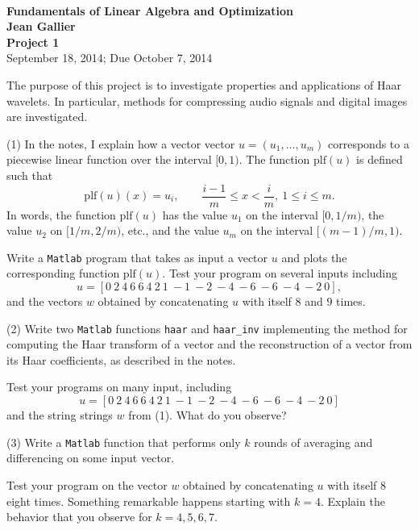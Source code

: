 \documentclass[12pt]{article}
\begin{document}
\begin{center}
\\
\vspace{1cm}
{\Large\bf Fundamentals of Linear Algebra and Optimization\\
Jean Gallier \\
\vspace{0.5cm}
Project 1}\\[10pt]
September 18,  2014; Due October 7, 2014\\
\end{center}

\vspace{0.5cm}
The purpose of this project is to investigate properties and
applications of Haar wavelets. In particular, methods for compressing 
audio signals and digital images are investigated.

\medskip
(1)
In  the notes, I explain how a vector
vector $u = (u_1, \ldots, u_m)$  corresponds to  a piecewise
linear function over the interval $[0, 1)$. The function
$\mathrm{plf}(u)$ is defined such that
\[
\mathrm{plf}(u)(x) = u_i, \quad\quad \frac{i -1}{m} \leq x < \frac{i}{m},
\> 1 \leq i \leq m. 
\]
In words, the function $\mathrm{plf}(u)$ has the  value
$u_1$ on the interval $[0, 1/m)$, the value $u_2$ on $[1/m, 2/m)$,
etc., and the value $u_m$ on the interval $[(m - 1)/m, 1)$.

\medskip
Write a {\tt Matlab} program that takes as input a vector $u$
and plots the corresponding function $\mathrm{plf}(u)$.
Test your program on several inputs including 
\[
u = [0\> 2\> 4\> 6\> 6\> 4\> 2\> 1\> -1\> -2\> -4\> -6\> -6\> -4\> -2\> 0],
\]
and the vectors $w$ obtained by concatenating $u$ with itself $8$ and
$9$ times.


\medskip
(2)
Write two {\tt Matlab} functions {\tt haar} and {\tt haar\_inv}
implementing the method for computing the Haar transform
of a vector and the reconstruction of a vector from its Haar
coefficients, as described in the notes.

\medskip
Test your programs on many input, including
\[
u =  [0\> 2\> 4\> 6\> 6\> 4\> 2\> 1\> -1\> -2\> -4\> -6\> -6\> -4\> -2\> 0]
\]
and the string strings $w$ from (1).
What do you observe?

\medskip
(3)
Write a {\tt Matlab} function
that performs only $k$ rounds of averaging and differencing
on some input vector. 

\medskip
Test your program on the vector $w$
obtained by concatenating $u$ with itself $8$ eight times.
Something remarkable happens starting with $k = 4$.
Explain the behavior that you observe for $k = 4, 5, 6, 7$.
\end{document}
